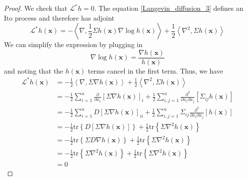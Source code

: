 \documentclass[12pt]{article}
\newcommand{\bx}{\mathbf{x}}
\newcommand{\gen}{\mathcal{L}} %
\newcommand{\ito}{\text{It}\hat{\text{o}}}
\newcommand{\dimState}{n}
\newcommand{\invariantDens}{h} %
\begin{document}
\begin{proof}
We check that $\gen^* \invariantDens = 0$. The equation \ref{Langevin_diffusion_3} defines an $\ito$ process and therefore has adjoint
\[
\gen^* \invariantDens(\bx) = -\left\langle \nabla, \frac{1}{2} \Sigma \invariantDens(\bx) \nabla \log \invariantDens(\bx) \right\rangle + \frac{1}{2} \left\langle \nabla^2, \Sigma \invariantDens(\bx)\right\rangle
\]
We can simplify the expression by plugging in 
\[
\nabla \log \invariantDens(\bx) = \frac{\nabla \invariantDens(\bx)}{\invariantDens(\bx)}
\]
and noting that the $\invariantDens(\bx)$ terms cancel in the first term. Thus, we have 
\begin{align*}
\gen^* \invariantDens(\bx) 
&= -\frac{1}{2}  \left\langle \nabla, \Sigma \nabla \invariantDens(\bx) \right\rangle + \frac{1}{2} \left\langle \nabla^2, \Sigma \invariantDens(\bx)\right\rangle \\
&= -\frac{1}{2} \sum_{i=1}^{\dimState} \frac{\partial}{\partial x_i} \left[\Sigma \nabla \invariantDens(\bx) \right]_i + \frac{1}{2} \sum_{i,j=1}^{\dimState} \frac{\partial^2}{\partial x_i \partial x_j} \left[\Sigma_{ij} \invariantDens(\bx) \right] \\
&= -\frac{1}{2} \sum_{i=1}^{\dimState} D\left[\Sigma \nabla \invariantDens(\bx) \right]_{ii} + \frac{1}{2} \sum_{i,j=1}^{\dimState} \Sigma_{ij}  \frac{\partial^2}{\partial x_i \partial x_j} \left[\invariantDens(\bx) \right] \\
&= -\frac{1}{2} \text{tr}\left\{D\left[\Sigma \nabla \invariantDens(\bx) \right] \right\} + \frac{1}{2} \text{tr}\left\{\Sigma \nabla^2 \invariantDens(\bx) \right\} \\
&= -\frac{1}{2} \text{tr}\left\{\Sigma D \nabla \invariantDens(\bx) \right\} + \frac{1}{2} \text{tr}\left\{\Sigma \nabla^2 \invariantDens(\bx) \right\} \\
&= -\frac{1}{2} \text{tr}\left\{\Sigma \nabla^2 \invariantDens(\bx) \right\} + \frac{1}{2} \text{tr}\left\{\Sigma \nabla^2 \invariantDens(\bx) \right\} \\
&= 0
\end{align*}


\end{proof}
\end{document}

